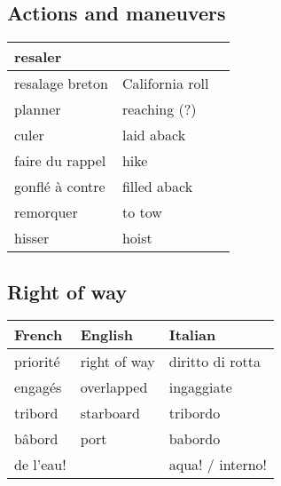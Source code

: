 \documentclass[a4paper, 12pt, twoside]{article}
\begin{document}
\begin{indt}{\section{Actions and maneuvers}}
\begin{tabular}{|l|l|l|}
            \hline %
            resaler %
            &
            &
            \\
            \hline %
            resalage breton %
            & California roll
            &
            \\
            \hline %
            planner %
            & reaching (?)
            &
            \\
            \hline %
            culer %
            & laid aback
            &
            \\
            \hline %
            faire du rappel %
            & hike
            &
            \\
            \hline %
            gonflé à contre %
            & filled aback
            &
            \\
            \hline %
            remorquer %
            & to tow
            &
            \\
            \hline %
            hisser %
            & hoist
            &
            \\
            \hline %
        \end{tabular}
    \end{indt} %

    \begin{indt}{\section{Right of way}} %
        \begin{tabular}{|l|l|l|}
            \hline %
            \textbf{French}
            & \textbf{English}
            & \textbf{Italian}
            \\
            \hline
            \hline %
            priorité %
            & right of way
            & diritto di rotta
            \\
            \hline %
            engagés %
            & overlapped
            & ingaggiate
            \\
            \hline %
            tribord %
            & starboard
            & tribordo
            \\
            \hline %
            bâbord %
            & port
            & babordo
            \\
            \hline %
            de l'eau! %
            &
            & aqua! / interno!
            \\
            \hline %
        \end{tabular}
    \end{indt} %
\end{document}
